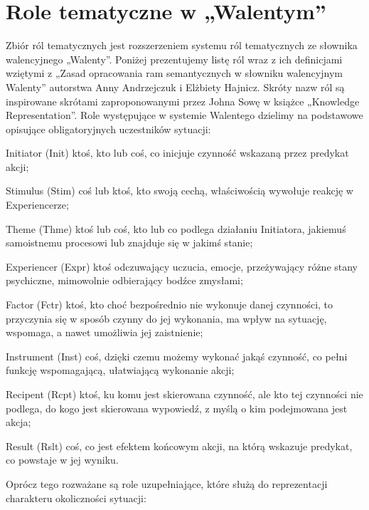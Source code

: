 \documentclass[a4paper,12pt]{article}
\begin{document}
\section{Role tematyczne w „Walentym”}
Zbiór ról tematycznych jest rozszerzeniem systemu ról tematycznych ze
słownika walencyjnego „Walenty”. Poniżej prezentujemy listę ról wraz z ich definicjami 
wziętymi z „Zasad opracowania ram semantycznych w słowniku
walencyjnym Walenty” autorstwa Anny Andrzejczuk i Elżbiety Hajnicz.
Skróty nazw ról są inspirowane skrótami zaproponowanymi przez
Johna Sowę w książce „Knowledge Representation”.
Role występujące w systemie Walentego dzielimy na podstawowe
opisujące obligatoryjnych uczestników sytuacji:
\begin{description}
\item{Initiator (Init)} ktoś, kto lub coś, co inicjuje czynność wskazaną przez predykat akcji;
\item{Stimulus (Stim)} coś lub ktoś, kto swoją cechą, właściwością wywołuje reakcję w Experiencerze;
\item{Theme (Thme)} ktoś lub coś, kto lub co podlega działaniu Initiatora, jakiemuś samoistnemu procesowi lub znajduje się w jakimś stanie;
\item{Experiencer (Expr)} ktoś odczuwający uczucia, emocje, przeżywający różne stany psychiczne, mimowolnie odbierający bodźce zmysłami;
\item{Factor (Fctr)} ktoś, kto choć bezpośrednio nie wykonuje danej czynności, to przyczynia się w sposób czynny do jej wykonania, ma wpływ na sytuację, wspomaga, a nawet umożliwia jej zaistnienie;
\item{Instrument (Inst)} coś, dzięki czemu możemy wykonać jakąś czynność, co pełni funkcję wspomagającą, ułatwiającą wykonanie akcji;
\item{Recipent (Rcpt)} ktoś, ku komu jest skierowana czynność, ale kto tej czynności nie podlega, do kogo jest skierowana wypowiedź, z myślą o kim podejmowana jest akcja;
\item{Result (Rslt)} coś, co jest efektem końcowym akcji, na którą wskazuje predykat, co powstaje w jej wyniku.
\end{description}
Oprócz tego rozważane są role uzupełniające, które służą do reprezentacji charakteru okoliczności sytuacji:
\end{document}
